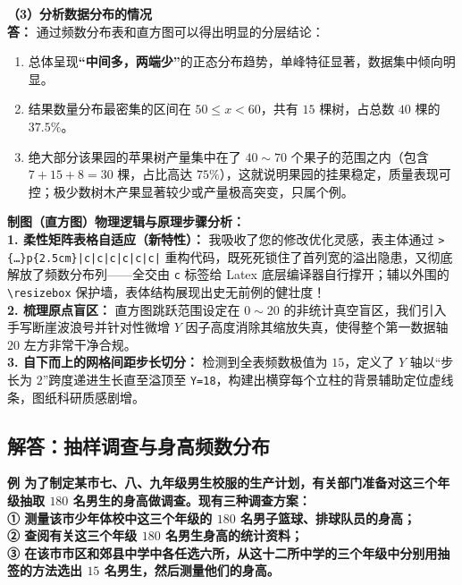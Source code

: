 \vspace{0.6cm}

\textbf{（3）分析数据分布的情况} \\
\textbf{答：} 通过频数分布表和直方图可以得出明显的分层结论：
\begin{enumerate}
    \item 总体呈现\textbf{“中间多，两端少”}的正态分布趋势，单峰特征显著，数据集中倾向明显。
    \item 结果数量分布最密集的区间在 $50 \leqslant x < 60$，共有 $15$ 棵树，占总数 $40$ 棵的 $37.5\%$。
    \item 绝大部分该果园的苹果树产量集中在了 $40 \sim 70$ 个果子的范围之内（包含 $7 + 15 + 8 = 30$ 棵，占比高达 $75\%$），这就说明果园的挂果稳定，质量表现可控；极少数树木产果显著较少或产量极高突变，只属个例。
\end{enumerate}

\vspace{0.6cm}

{\small\color{blue!70!black}
\textbf{制图（直方图）物理逻辑与原理步骤分析：}\\
\textbf{1. 柔性矩阵表格自适应（新特性）：} 我吸收了您的修改优化灵感，表主体通过 \texttt{>\{\dots\}p\{2.5cm\}|c|c|c|c|c|c|} 重构代码，既死死锁住了首列宽的溢出隐患，又彻底解放了频数分布列——全交由 \texttt{c} 标签给 Latex 底层编译器自行撑开；辅以外围的 \texttt{\textbackslash resizebox} 保护墙，表体结构展现出史无前例的健壮度！\\
\textbf{2. 梳理原点盲区：} 直方图跳跃范围设定在 $0 \sim 20$ 的非统计真空盲区，我们引入手写断崖波浪号并针对性微增 $Y$ 因子高度消除其缩放失真，使得整个第一数据轴 $20$ 左方非常干净合规。\\
\textbf{3. 自下而上的网格间距步长切分：} 检测到全表频数极值为 $15$，定义了 $Y$ 轴以“步长为 $2$”跨度递进生长直至溢顶至 \texttt{Y=18}，构建出横穿每个立柱的背景辅助定位虚线条，图纸科研质感剧增。
}

\newpage

\newpage

\subsection{解答：抽样调查与身高频数分布}

\vspace{0.6cm}

\textbf{例 为了制定某市七、八、九年级男生校服的生产计划，有关部门准备对这三个年级抽取 $180$ 名男生的身高做调查。现有三种调查方案：\\
① 测量该市少年体校中这三个年级的 $180$ 名男子篮球、排球队员的身高；\\
② 查阅有关这三个年级 $180$ 名男生身高的统计资料；\\
③ 在该市市区和郊县中学中各任选六所，从这十二所中学的三个年级中分别用抽签的方法选出 $15$ 名男生，然后测量他们的身高。}

